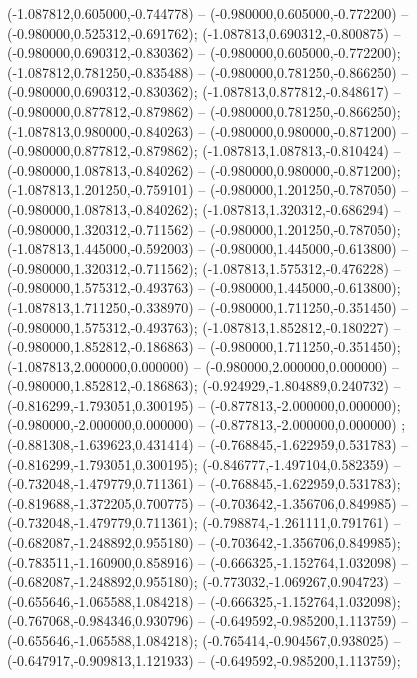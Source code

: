  (-1.087812,0.605000,-0.744778) -- (-0.980000,0.605000,-0.772200) -- (-0.980000,0.525312,-0.691762);
 (-1.087813,0.690312,-0.800875) -- (-0.980000,0.690312,-0.830362) -- (-0.980000,0.605000,-0.772200);
 (-1.087812,0.781250,-0.835488) -- (-0.980000,0.781250,-0.866250) -- (-0.980000,0.690312,-0.830362);
 (-1.087813,0.877812,-0.848617) -- (-0.980000,0.877812,-0.879862) -- (-0.980000,0.781250,-0.866250);
 (-1.087813,0.980000,-0.840263) -- (-0.980000,0.980000,-0.871200) -- (-0.980000,0.877812,-0.879862);
 (-1.087813,1.087813,-0.810424) -- (-0.980000,1.087813,-0.840262) -- (-0.980000,0.980000,-0.871200);
 (-1.087813,1.201250,-0.759101) -- (-0.980000,1.201250,-0.787050) -- (-0.980000,1.087813,-0.840262);
 (-1.087813,1.320312,-0.686294) -- (-0.980000,1.320312,-0.711562) -- (-0.980000,1.201250,-0.787050);
 (-1.087813,1.445000,-0.592003) -- (-0.980000,1.445000,-0.613800) -- (-0.980000,1.320312,-0.711562);
 (-1.087813,1.575312,-0.476228) -- (-0.980000,1.575312,-0.493763) -- (-0.980000,1.445000,-0.613800);
 (-1.087813,1.711250,-0.338970) -- (-0.980000,1.711250,-0.351450) -- (-0.980000,1.575312,-0.493763);
 (-1.087813,1.852812,-0.180227) -- (-0.980000,1.852812,-0.186863) -- (-0.980000,1.711250,-0.351450);
 (-1.087813,2.000000,0.000000) -- (-0.980000,2.000000,0.000000) -- (-0.980000,1.852812,-0.186863);
 (-0.924929,-1.804889,0.240732) -- (-0.816299,-1.793051,0.300195) -- (-0.877813,-2.000000,0.000000);
 (-0.980000,-2.000000,0.000000) -- (-0.877813,-2.000000,0.000000) ;
 (-0.881308,-1.639623,0.431414) -- (-0.768845,-1.622959,0.531783) -- (-0.816299,-1.793051,0.300195);
 (-0.846777,-1.497104,0.582359) -- (-0.732048,-1.479779,0.711361) -- (-0.768845,-1.622959,0.531783);
 (-0.819688,-1.372205,0.700775) -- (-0.703642,-1.356706,0.849985) -- (-0.732048,-1.479779,0.711361);
 (-0.798874,-1.261111,0.791761) -- (-0.682087,-1.248892,0.955180) -- (-0.703642,-1.356706,0.849985);
 (-0.783511,-1.160900,0.858916) -- (-0.666325,-1.152764,1.032098) -- (-0.682087,-1.248892,0.955180);
 (-0.773032,-1.069267,0.904723) -- (-0.655646,-1.065588,1.084218) -- (-0.666325,-1.152764,1.032098);
 (-0.767068,-0.984346,0.930796) -- (-0.649592,-0.985200,1.113759) -- (-0.655646,-1.065588,1.084218);
 (-0.765414,-0.904567,0.938025) -- (-0.647917,-0.909813,1.121933) -- (-0.649592,-0.985200,1.113759);
